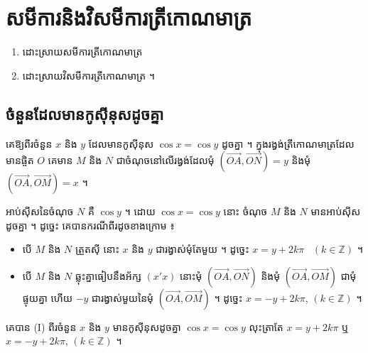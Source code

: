 \chapter{សមីការនិងវិសមីការត្រីកោណមាត្រ}

\begin{objBox}[វត្ថុបំណង]
\begin{enumerate}[1]
  \item ដោះស្រាយសមីការត្រីកោណមាត្រ
  \item ដោះស្រាយវិសមីការត្រីកោណមាត្រ ។
\end{enumerate}
\end{objBox}

\section{ចំនួនដែលមានកូស៊ីនុសដូចគ្នា}

គេឱ្យពីរចំនួន $x$ និង $y$ ដែលមានកូស៊ីនុស $\cos x = \cos y$ ដូចគ្នា ។ ក្នុងរង្វង់ត្រីកោណមាត្រដែលមានផ្ចិត $O$ គេមាន $M$ និង $N$ ជាចំណុចនៅលើរង្វង់ដែលមុំ $(\overrightarrow{OA}, \overrightarrow{ON}) = y$ និងមុំ $(\overrightarrow{OA}, \overrightarrow{OM}) = x$ ។
\begin{center}
\end{center}
អាប់ស៊ីសនៃចំណុច $N$ គឺ $\cos y$ ។ ដោយ $\cos x = \cos y$ នោះ ចំណុច $M$ និង $N$ មានអាប់ស៊ីសដូចគ្នា ។ ដូច្នេះ គេបានករណីពីរដូចខាងក្រោម ៖
\begin{itemize}
  \item បើ $M$ និង $N$ ត្រួតស៊ី នោះ $x$ និង $y$ ជារង្វាស់មុំតែមួយ ។ ដូច្នេះ $x = y + 2k\pi$ \ $(k \in \mathbb{Z})$ ។
  \item បើ $M$ និង $N$ ឆ្លុះគ្នាធៀបនឹងអ័ក្ស $(x'x)$ នោះមុំ $(\overrightarrow{OA}, \overrightarrow{ON})$ និងមុំ $(\overrightarrow{OA}, \overrightarrow{OM})$ ជាមុំផ្ទុយគ្នា ហើយ $-y$ ជារង្វាស់មួយនៃមុំ $(\overrightarrow{OA}, \overrightarrow{OM})$ ។ ដូច្នេះ $x = -y + 2k\pi$, $(k \in \mathbb{Z})$ ។
\end{itemize}
\begin{formulaBox}[ជាទូទៅ]
គេបាន (I) ពីរចំនួន $x$ និង $y$ មានកូស៊ីនុសដូចគ្នា $\cos x = \cos y$ លុះត្រាតែ $x = y + 2k\pi$ ឬ $x = -y + 2k\pi$, $(k \in \mathbb{Z})$ ។
\end{formulaBox}

